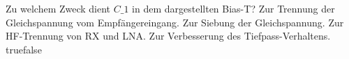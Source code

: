     {Zu welchem Zweck dient $C\_1$ in dem dargestellten Bias-T?}
    {Zur Trennung der Gleichspannung vom Empfängereingang.}
    {Zur Siebung der Gleichspannung.}
    {Zur HF-Trennung von RX und LNA.}
    {Zur Verbesserung des Tiefpass-Verhaltens.}
    {true}{false}
